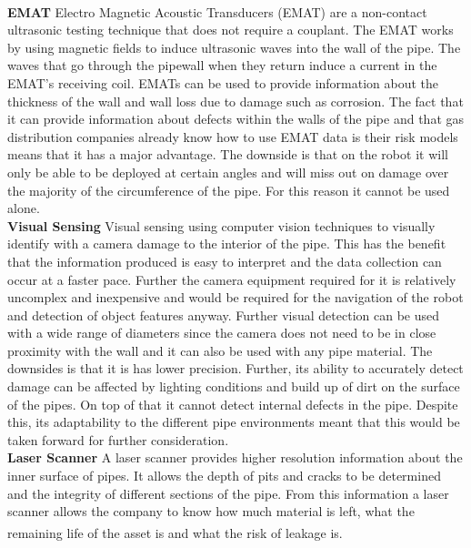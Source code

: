 \documentclass[11pt]{article}		%
\newcommand{\supercite}[1]{\textsuperscript{\cite{#1}}}		%
\begin{document}
	        \\
	        \textbf{EMAT}
	        Electro Magnetic Acoustic Transducers (EMAT) are a non-contact ultrasonic testing technique that does not require a couplant. 
	        The EMAT works by using magnetic fields to induce ultrasonic waves into the wall of the pipe.
	        The waves that go through the pipewall when they return induce a current in the EMAT’s receiving coil.
	        EMATs can be used to provide information about the thickness of the wall and wall loss due to damage such as corrosion. 
	        The fact that it can provide information about defects within the walls of the pipe and that gas distribution companies already know how to use EMAT data is their risk models means that it has a major advantage. 
	        The downside is that on the robot it will only be able to be deployed at certain angles and will miss out on damage over the majority of the circumference of the pipe. 
	        For this reason it  cannot be used alone.
			\\
			\textbf{Visual Sensing}
	        Visual sensing using computer vision techniques to visually identify with a camera damage to the interior of the pipe. 
	        This has the benefit that the information produced is easy to interpret and the data collection can occur at a faster pace. %
	        Further the camera equipment required for it is relatively uncomplex and inexpensive and would be required for the navigation of the robot and detection of object features anyway. 
	        Further visual detection can be used with a wide range of diameters since the camera does not need to be in close proximity with the wall and it can also be used with any pipe material. 
	        The downsides is that it is has lower precision. Further, its ability to accurately detect damage can be affected by lighting conditions and build up of dirt on the surface of the pipes. 
	        On top of that it cannot detect internal defects in the pipe.
	        Despite this, its adaptability to the different pipe environments meant that this would be taken forward for further consideration.
	        \\
	        \textbf{Laser Scanner}
	        A laser scanner provides higher resolution information about the inner surface of pipes. %
	        It allows the depth of pits and cracks to be determined and the integrity of different sections of the pipe. 
	        From this information a laser scanner allows the company to know how much material is left, what the remaining life of the asset is and what the risk of leakage is. \supercite{2g_robotics}
\end{document}
